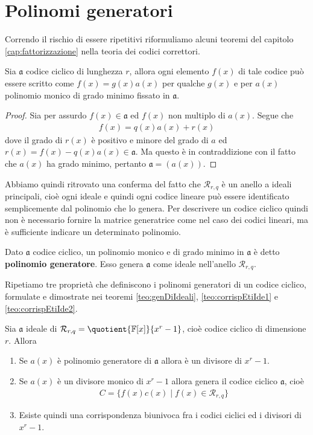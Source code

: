 \section{Polinomi generatori}

Correndo il rischio di essere ripetitivi riformuliamo alcuni teoremi del capitolo \ref{cap:fattorizzazione} nella teoria dei codici correttori.
\begin{teorema}
   Sia $\mathfrak{a}$ codice ciclico di lunghezza $r$, allora ogni elemento $f(x)$ di tale codice può essere scritto come
   $f(x) = g(x)a(x)$ per qualche $g(x)$ e per $a(x)$ polinomio monico di grado minimo fissato in $\mathfrak{a}$.
\end{teorema}
\begin{proof}
   Sia per assurdo $f(x) \in \mathfrak{a}$ ed $f(x)$ non multiplo di $a(x)$. Segue che
   \begin{align*}
      f(x) = q(x)a(x) + r(x)
   \end{align*}
   dove il grado di $r(x)$ è positivo e minore del grado di $a$ ed $r(x) = f(x) - q(x)a(x) \in \mathfrak{a}$. Ma questo è in contraddizione con il fatto che $a(x)$ ha grado minimo, pertanto $\mathfrak{a} = (a(x))$.
\end{proof}
\noindent
  Abbiamo quindi ritrovato una conferma del fatto che $\mathcal{R}_{r, q}$ è un anello a ideali principali, cioè ogni ideale e quindi ogni codice lineare può essere identificato semplicemente dal polinomio che lo genera. Per descrivere un codice ciclico quindi non è necessario fornire la matrice generatrice come nel caso dei codici lineari, ma è sufficiente indicare un determinato polinomio.
\begin{definizione}
   Dato $\mathfrak{a}$ codice ciclico, un polinomio monico e di grado minimo in $\mathfrak{a}$ è detto {\bf polinomio generatore}. Esso genera $\mathfrak{a}$ come ideale nell'anello $\mathcal{R}_{r, q}$.
\end{definizione}
\noindent
Ripetiamo tre proprietà che definiscono i polinomi generatori di un codice ciclico, formulate e dimostrate nei teoremi \ref{teo:genDiIdeali}, \ref{teo:corrispEtiIde1} e \ref{teo:corrispEtiIde2}.
\begin{teorema}
   Sia $\mathfrak{a}$ ideale di $\mathcal{R}_{r, q} = \quotient{\mathbb{F} \lbrack x \rbrack  }{ x^{r}- 1}$, cioè codice ciclico di dimensione $r$.  Allora
   \begin{enumerate}
      \item Se $a(x)$ è polinomio generatore di $\mathfrak{a}$ allora è un divisore di $x^r - 1$.
      \item Se $a(x)$ è un divisore monico di $x^r-1$ allora genera il codice ciclico $\mathfrak{a}$, cioè
      \begin{align*}
         C = \lbrace f(x)c(x) \mid f(x) \in \mathcal{R}_{r, q}  \rbrace
      \end{align*}
      \item Esiste quindi una corrispondenza biunivoca fra i codici ciclici ed i divisori di $x^r - 1$.
   \end{enumerate}
\end{teorema}
